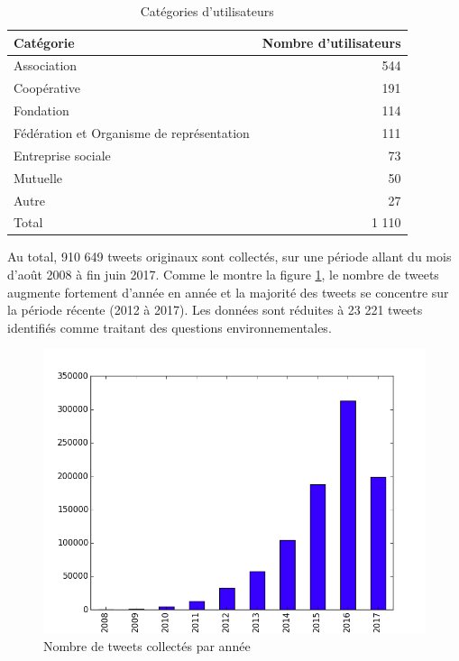     \begin{table}[h]
        \caption{Catégories d'utilisateurs}
        \label{table:categoriesutilisateurs}
        \centering
        \begin{tabular}{|l|r|}
        \hline
            \textbf{Catégorie} & \textbf{Nombre d'utilisateurs} \\ \hline
            Association & 544  \\ \hline
            Coopérative& 191  \\ \hline
            Fondation& 114  \\ \hline
            Fédération et Organisme de représentation & 111  \\ \hline
            Entreprise sociale& 73  \\ \hline
            Mutuelle& 50  \\ \hline
            Autre& 27  \\ \hline
            Total& 1 110  \\ \hline
        \end{tabular}
    \end{table}

    Au total, 910 649 tweets originaux sont collectés, sur une période allant du mois d’août 2008 à fin juin 2017. Comme le montre la figure \ref{figure:tweetsparannees}, le nombre de tweets augmente fortement d’année en année et la majorité des tweets se concentre sur la période récente (2012 à 2017). Les données sont réduites à 23 221 tweets identifiés comme traitant des questions environnementales.

    \begin{figure}
        \caption{Nombre de tweets collectés par année}
        \label{figure:tweetsparannees}
        \centering
        \includegraphics[width=\linewidth]{fig/fig1.png}
    \end{figure}

